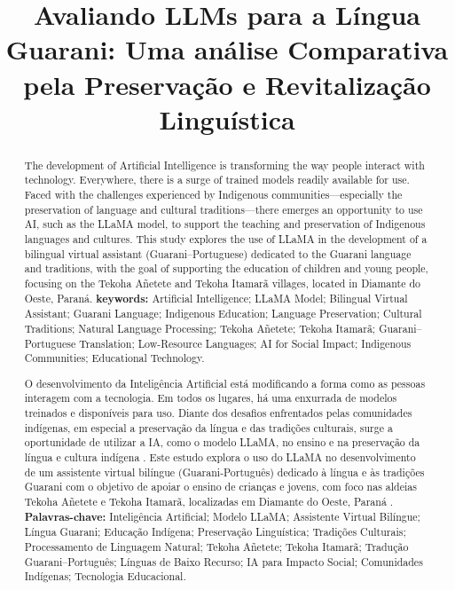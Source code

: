 \documentclass[12pt]{article}
\title{Avaliando LLMs para a Língua Guarani: Uma análise Comparativa pela Preservação e Revitalização Linguística}
\begin{document}
\maketitle

\begin{abstract}
The development of Artificial Intelligence is transforming the way people interact with technology. Everywhere, there is a surge of trained models readily available for use. Faced with the challenges experienced by Indigenous communities—especially the preservation of language and cultural traditions—there emerges an opportunity to use AI, such as the LLaMA model, to support the teaching and preservation of Indigenous languages and cultures. This study explores the use of LLaMA in the development of a bilingual virtual assistant (Guarani–Portuguese) dedicated to the Guarani language and traditions, with the goal of supporting the education of children and young people, focusing on the Tekoha Añetete and Tekoha Itamarã villages, located in Diamante do Oeste, Paraná.
\textbf{keywords:} Artificial Intelligence; LLaMA Model; Bilingual Virtual Assistant; Guarani Language; Indigenous Education; Language Preservation; Cultural Traditions; Natural Language Processing; Tekoha Añetete; Tekoha Itamarã; Guarani–Portuguese Translation; Low-Resource Languages; AI for Social Impact; Indigenous Communities; Educational Technology.
\end{abstract}


\renewcommand{\abstractname}{Resumo}

\begin{abstract}
O desenvolvimento da Inteligência Artificial está modificando a forma como as pessoas interagem com a tecnologia. Em todos os lugares, há uma enxurrada de modelos treinados e disponíveis para uso. Diante dos desafios enfrentados pelas comunidades indígenas, em especial a preservação da língua e das tradições culturais, surge a oportunidade de utilizar a IA, como o modelo LLaMA, no ensino e na preservação da língua e cultura indígena \cite{deferia2024uso}. Este estudo explora o uso do LLaMA no desenvolvimento de um assistente virtual bilíngue (Guarani-Português) dedicado à língua e às tradições Guarani com o objetivo de apoiar o ensino de crianças e jovens, com foco nas aldeias Tekoha Añetete e Tekoha Itamarã, localizadas em Diamante do Oeste, Paraná \cite{cabral2016guarani, kuhl2013etno}.
\textbf{Palavras-chave:} Inteligência Artificial; Modelo LLaMA; Assistente Virtual Bilíngue; Língua Guarani; Educação Indígena; Preservação Linguística; Tradições Culturais; Processamento de Linguagem Natural; Tekoha Añetete; Tekoha Itamarã; Tradução Guarani–Português; Línguas de Baixo Recurso; IA para Impacto Social; Comunidades Indígenas; Tecnologia Educacional.
\end{abstract}
\end{document}
